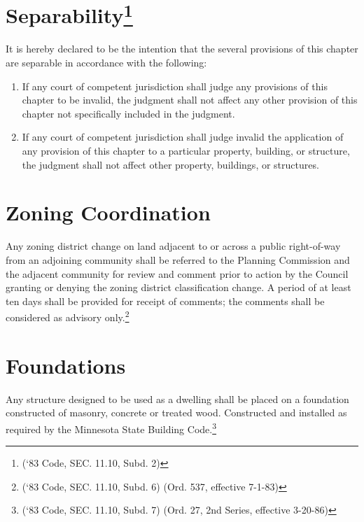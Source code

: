 \section{Separability\footnote{(‘83 Code, SEC. 11.10, Subd. 2)}}
It is hereby declared to be the intention that the several provisions of this chapter are separable in accordance with the following:
\begin{enumerate}[{\indent}A)]
    \item If any court of competent jurisdiction shall judge any provisions of this chapter to be invalid, the judgment shall not affect any other provision of this chapter not specifically included in the judgment.
    \item If any court of competent jurisdiction shall judge invalid the application of any provision of this chapter to a particular property, building, or structure, the judgment shall not affect other property, buildings, or structures.
\end{enumerate}

\section{Zoning Coordination}
Any zoning district change on land adjacent to or across a public right-of-way from an adjoining community shall be referred to the Planning Commission and the adjacent community for review and comment prior to action by the Council granting or denying the zoning district classification change.  A period of at least ten days shall be provided for receipt of comments; the comments shall be considered as advisory only.\footnote{(‘83 Code, SEC. 11.10, Subd. 6)  (Ord. 537, effective 7-1-83)}

\section{Foundations}
Any structure designed to be used as a dwelling shall be placed on a foundation constructed of masonry, concrete or treated wood. Constructed and installed as required by the Minnesota State Building Code.\footnote{(‘83 Code, SEC. 11.10, Subd. 7)  (Ord. 27, 2nd Series, effective 3-20-86)}


\setcounter{section}{19}
